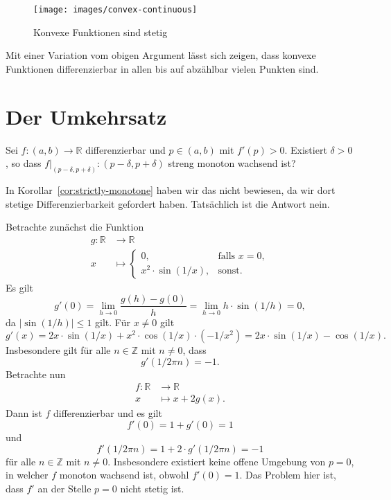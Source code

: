 \documentclass[../main.tex]{subfiles}
\begin{document}
\begin{figure}[htb]
  \centering
  \texttt{[image: images/convex-continuous]}
  \caption{Konvexe Funktionen sind stetig}%
  \label{fig:convex-continuous}
\end{figure}

Mit einer Variation vom obigen Argument lässt sich zeigen,
dass konvexe Funktionen differenzierbar in allen
bis auf abzählbar vielen Punkten sind.

\section{Der Umkehrsatz}
\begin{question}
  Sei $f \colon (a, b) \to \mathbb{R}$ differenzierbar
  und $p \in (a, b)$ mit $f'(p) > 0$.
  Existiert $\delta > 0$, so dass
  $f|_{(p - \delta, p + \delta)} \colon
  (p - \delta, p + \delta)$ streng monoton wachsend ist?
\end{question}

In Korollar~\ref{cor:strictly-monotone} haben wir das
nicht bewiesen, da wir dort stetige
Differenzierbarkeit gefordert haben.
Tatsächlich ist die Antwort nein.

\begin{example}
  Betrachte zunächst die Funktion
  \begin{align*}
    g \colon \mathbb{R} & \to \mathbb{R} \\
    x & \mapsto
    \begin{cases}
      0, & \text{falls $x = 0$}, \\
      x^2 \cdot \sin(1/x), & \text{sonst}.
    \end{cases}
  \end{align*}
Es gilt
\[
  g'(0) = \lim_{h \to 0} \frac{g(h) - g(0)}{h}
  = \lim_{h \to 0} h \cdot \sin(1/h) = 0,
\]
da $|\sin(1/h)| \leq 1$ gilt.
Für $x \neq 0$ gilt
\[
  g'(x) = 2x \cdot \sin(1/x) + x^2 \cdot \cos(1/x) \cdot (-1/x^2)
  = 2x \cdot \sin(1/x) - \cos (1/x).
\]
Insbesondere gilt für alle $n \in \mathbb{Z}$ mit
$n \neq 0$, dass
\[
  g'(1/2\pi n) = -1.
\]
Betrachte nun
\begin{align*}
  f \colon \mathbb{R} & \to \mathbb{R} \\
  x & \mapsto x + 2g(x).
\end{align*}
Dann ist $f$ differenzierbar und es gilt
\[
  f'(0) = 1 + g'(0) = 1
\]
und
\[
  f'(1/2 \pi n) = 1 + 2 \cdot g'(1/ 2 \pi n) = -1
\]
für alle $n \in \mathbb{Z}$ mit $n \neq 0$.
Insbesondere existiert keine offene
Umgebung von $p = 0$,
in welcher $f$ monoton wachsend ist,
obwohl $f'(0) = 1$.
Das Problem hier ist, dass
$f'$ an der Stelle $p = 0$ nicht stetig ist.
\end{example}
\end{document}
